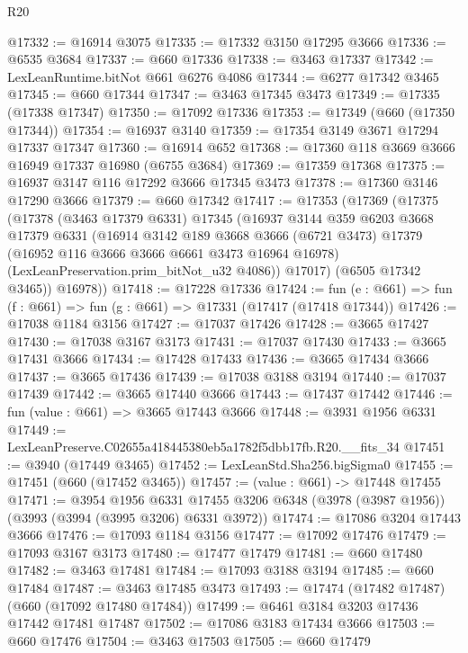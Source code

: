 \begin{lexlean}{R20}
\begin{coremodule}
@17332 := @16914 @3075
@17335 := @17332 @3150 @17295 @3666
@17336 := @6535 @3684
@17337 := @660 @17336
@17338 := @3463 @17337
@17342 := LexLeanRuntime.bitNot @661 @6276 @4086
@17344 := @6277 @17342 @3465
@17345 := @660 @17344
@17347 := @3463 @17345 @3473
@17349 := @17335 (@17338 @17347)
@17350 := @17092 @17336
@17353 := @17349 (@660 (@17350 @17344))
@17354 := @16937 @3140
@17359 := @17354 @3149 @3671 @17294 @17337 @17347
@17360 := @16914 @652
@17368 := @17360 @118 @3669 @3666 @16949 @17337 @16980 (@6755 @3684)
@17369 := @17359 @17368
@17375 := @16937 @3147 @116 @17292 @3666 @17345 @3473
@17378 := @17360 @3146 @17290 @3666
@17379 := @660 @17342
@17417 := @17353
    (@17369
      (@17375
        (@17378
          (@3463 @17379 @6331)
          @17345
          (@16937
            @3144
            @359
            @6203
            @3668
            @17379
            @6331
            (@16914
              @3142
              @189
              @3668
              @3666
              (@6721 @3473)
              @17379
              (@16952 @116 @3666 @3666 @6661 @3473 @16964 @16978)
              (LexLeanPreservation.prim_bitNot_u32 @4086))
            @17017)
          (@6505 @17342 @3465))
        @16978))
@17418 := @17228 @17336
@17424 := fun (e : @661) => fun (f : @661) => fun (g : @661) => @17331 (@17417 (@17418 @17344))
@17426 := @17038 @1184 @3156
@17427 := @17037 @17426
@17428 := @3665 @17427
@17430 := @17038 @3167 @3173
@17431 := @17037 @17430
@17433 := @3665 @17431 @3666
@17434 := @17428 @17433
@17436 := @3665 @17434 @3666
@17437 := @3665 @17436
@17439 := @17038 @3188 @3194
@17440 := @17037 @17439
@17442 := @3665 @17440 @3666
@17443 := @17437 @17442
@17446 := fun (value : @661) => @3665 @17443 @3666
@17448 := @3931 @1956 @6331
@17449 := LexLeanPreserve.C02655a418445380eb5a1782f5dbb17fb.R20.__fits_34
@17451 := @3940 (@17449 @3465)
@17452 := LexLeanStd.Sha256.bigSigma0
@17455 := @17451 (@660 (@17452 @3465))
@17457 := (value : @661) -> @17448 @17455
@17471 := @3954
    @1956
    @6331
    @17455
    @3206
    @6348
    (@3978 (@3987 @1956))
    (@3993 (@3994 (@3995 @3206) @6331 @3972))
@17474 := @17086 @3204 @17443 @3666
@17476 := @17093 @1184 @3156
@17477 := @17092 @17476
@17479 := @17093 @3167 @3173
@17480 := @17477 @17479
@17481 := @660 @17480
@17482 := @3463 @17481
@17484 := @17093 @3188 @3194
@17485 := @660 @17484
@17487 := @3463 @17485 @3473
@17493 := @17474 (@17482 @17487) (@660 (@17092 @17480 @17484))
@17499 := @6461 @3184 @3203 @17436 @17442 @17481 @17487
@17502 := @17086 @3183 @17434 @3666
@17503 := @660 @17476
@17504 := @3463 @17503
@17505 := @660 @17479

\end{coremodule}
\end{lexlean}
